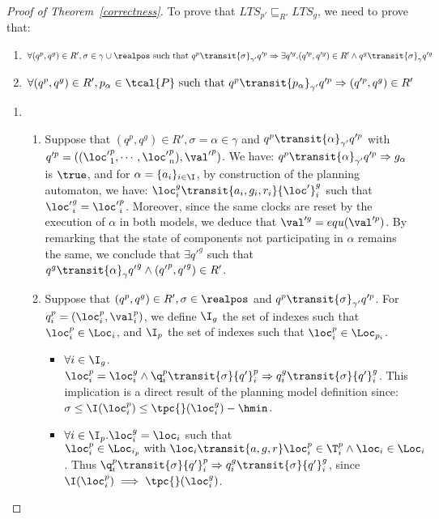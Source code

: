   \begin{proof}[Proof of Theorem~\ref{correctness}]
    To prove that $LTS_{p'}\sqsubseteq_{R'} LTS_g$, we need to prove that:

  \begin{enumerate}
    \item $\forall(q^p,q^g)\in R',\sigma\in\gamma\cup\realpos\text{ such that }q^p\transit{\sigma}_{\gamma'}q'^{p}\Rightarrow\exists q'^g.(q'^{p},q'^g)\in R'\wedge 
      q^g\transit{\sigma}_{\gamma}q'^g$
    \item $\forall(q^p,q^g)\in R',p_{\alpha}\in\tcal{P}\text{ such that }q^p\transit{p_{\alpha}}_{\gamma'}q'^{p}\Rightarrow(q'^{p},q^g)\in R'$ 
  \end{enumerate}

  \begin{enumerate}
    \item
  \begin{enumerate}
    \item Suppose that $(q^p,q^g)\in R',\sigma=\alpha\in\gamma$ and $q^p\transit{\alpha}_{\gamma'}q'^{p}$ with $q'^p=(({\loc'}_1^p,\cdots,{\loc'}_n^p),{\val'}^p)$. We have:
      $q^p\transit{\alpha}_{\gamma'}q'^{p}\Rightarrow g_{\alpha}$ is $\true$, and for 
      $\alpha=\{a_i\}_{i\in\I}$, by construction of the planning automaton, we have:
      $\loc_i^g\transit{a_i,g_i,r_i}{\loc'}_i^g$ such that ${\loc'}_i^g={\loc'}_i^p$. Moreover, 
     since the same clocks are reset by the execution of $\alpha$ in both models, we deduce that $\val'^g=equ(\val'^p)$. 
      By remarking that the state of components not participating in $\alpha$ remains the same, we conclude that $\exists {q'}^g$ such that 
      $q^g\transit{\alpha}_{\gamma}{q'}^g\wedge({q'}^p,{q'}^g)\in R'$. 
    \item Suppose that $(q^p,q^g)\in R',\sigma\in\realpos$ and $q^p\transit{\sigma}_{\gamma'}
      q'^{p}$. For $q^p_i=(\loc_i^p,\val_i^p)$, we define $\I_g$ the set of indexes such that 
       $\loc_i^p\in\Loc_i$, and $\I_p$ the set of indexes such that $\loc_i^p\in\Loc_{p_i}$. 
       \begin{itemize}
         \item $\forall i\in\I_g$.$\loc_i^p=\loc_i^g\wedge\q_i^p\transit{\sigma}
           {q'}_i^p\Rightarrow q_i^g\transit{\sigma}{q'}_i^g$. This implication is a direct result of the planning model definition since: $\sigma\le\I(\loc_i^p)\le\tpc{}(\loc_i^g)-\hmin$.
           
         \item $\forall i\in\I_p.\loc_i^g=\loc_i$ such that $\loc^p_i\in\Loc_{i_p}\text{ with }\loc_i\transit{a,g,r}\loc_i^p\in\T_i^p\wedge\loc_i\in\Loc_i$.
           Thus $\q_i^p\transit{\sigma}{q'}_i^p\Rightarrow q_i^g\transit{\sigma}{q'}_i^g$, since $\I(\loc_i^p)\implies\tpc{}(\loc_i^g)$.


\end{itemize}
\end{enumerate}
\end{enumerate}
\end{proof}

